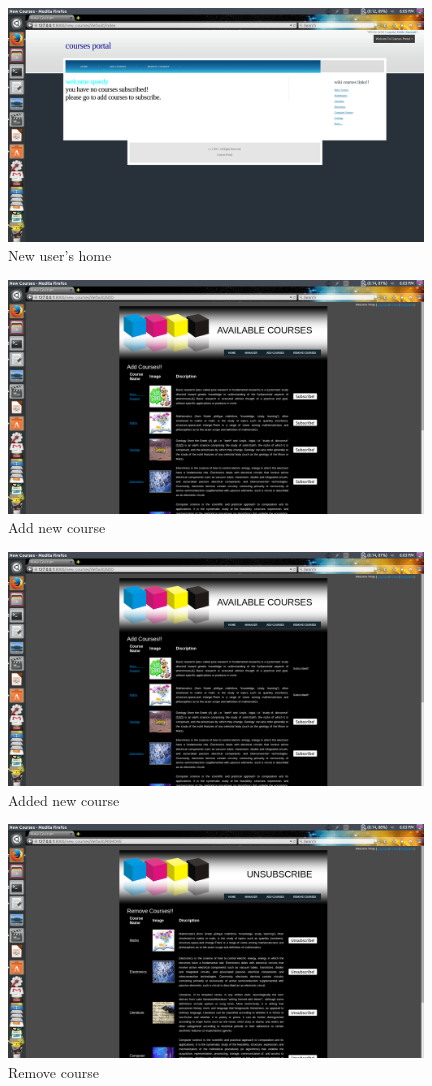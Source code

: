 \documentclass{article}
\begin{document}
\begin{figure}[ht!]
\centering
\includegraphics[width=110mm]{new_user.png}
\caption{New user's home}
\end{figure}
\begin{figure}[ht!]
\centering
\includegraphics[width=110mm]{ADD.png}
\caption{Add new course}
\end{figure}
\begin{figure}[ht!]
\centering
\includegraphics[width=110mm]{added.png}
\caption{Added new course}
\end{figure}
\begin{figure}[ht!]
\centering
\includegraphics[width=110mm]{remove.png}
\caption{Remove course}
\end{figure}
\end{document}
